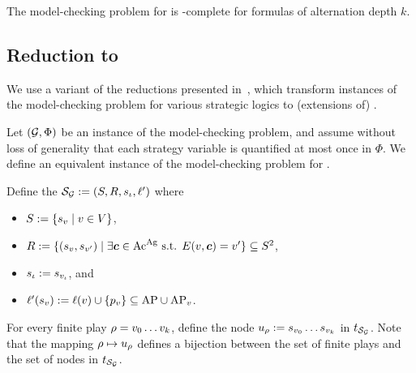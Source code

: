 \begin{theorem}
  \label{theo-qctls}
  The model-checking problem for \QCTLs is \kEXPTIME[k+1]-complete for
  formulas of alternation depth $k$.
\end{theorem}

\subsection{Reduction to \QCTLs}
\label{sec-reduction}

We use a variant of the reductions presented
in~\cite{DBLP:journals/iandc/LaroussinieM15,DBLP:conf/csl/FijalkowMMR18,BMMRV17,DBLP:conf/kr/MaubertM18,DBLP:conf/ijcai/BouyerKMMMP19},
which transform instances of the model-checking problem for various
strategic logics to (extensions of) \QCTLs.

Let $(\CGS,\Phi)$ be an instance of the \SL
model-checking problem, and assume without loss of generality that
each strategy variable is quantified at most once in $\Phi$. We define an equivalent instance of the
model-checking problem for \QCTLs.


Define the \KS $\KS_{\CGS}\egdef(\setstates,\relation,\sstate_{\init},\lab')$ where
\begin{itemize}
\item $S:=\{s_{v} \mid v\in V\}$,
\item $R:=\{(s_{v},s_{v'})\mid
  \exists\bm{c}\in\textnormal{Ac}^{\textnormal{Ag}} \mbox{ s.t. }E(v,\bm{c})=v'\}
  \subseteq S^2$,
  \item $s_{{\iota}}:=s_{v_{{\iota}}}$, and
\item $\ell'(s_{v}):=\ell(v)\cup \{p_{v}\} \subseteq \textnormal{AP} \cup \textnormal{AP}_{v}$.
\end{itemize}



For every finite play $\rho=v_{0}\ldots v_{k}$, define
the node $u_{\rho}:= s_{v_{0}}\ldots s_{v_{k}}$ in
$\unfold[\KS_{\CGS}]{\sstate_{\pos_{0}}}$.  Note that the mapping
$\rho\mapsto u_{\rho}$ defines a bijection between the set
of finite plays and the set of
nodes in $\unfold[\KS_{\CGS}]{\sstate_{\init}}$. %



